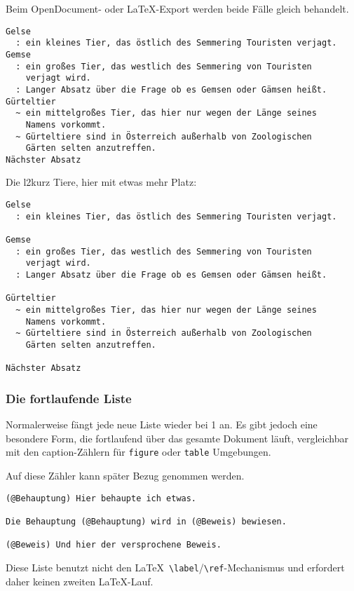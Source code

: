 \documentclass[11pt,ngerman,a4paper]{article}
\begin{document}
Beim OpenDocument- oder LaTeX-Export werden beide Fälle gleich
behandelt.

\begin{verbatim}
Gelse
  : ein kleines Tier, das östlich des Semmering Touristen verjagt.
Gemse
  : ein großes Tier, das westlich des Semmering von Touristen 
    verjagt wird.
  : Langer Absatz über die Frage ob es Gemsen oder Gämsen heißt.
Gürteltier
  ~ ein mittelgroßes Tier, das hier nur wegen der Länge seines 
    Namens vorkommt.
  ~ Gürteltiere sind in Österreich außerhalb von Zoologischen 
    Gärten selten anzutreffen.
Nächster Absatz
\end{verbatim}

Die l2kurz Tiere, hier mit etwas mehr Platz:

\begin{verbatim}
Gelse
  : ein kleines Tier, das östlich des Semmering Touristen verjagt.

Gemse
  : ein großes Tier, das westlich des Semmering von Touristen 
    verjagt wird.
  : Langer Absatz über die Frage ob es Gemsen oder Gämsen heißt.

Gürteltier
  ~ ein mittelgroßes Tier, das hier nur wegen der Länge seines 
    Namens vorkommt.
  ~ Gürteltiere sind in Österreich außerhalb von Zoologischen 
    Gärten selten anzutreffen.

Nächster Absatz
\end{verbatim}

\subsubsection{Die fortlaufende Liste}

Normalerweise fängt jede neue Liste wieder bei 1 an. Es gibt jedoch eine
besondere Form, die fortlaufend über das gesamte Dokument läuft,
vergleichbar mit den caption-Zählern für \texttt{figure} oder
\texttt{table} Umgebungen.

Auf diese Zähler kann später Bezug genommen werden.

\begin{verbatim}
(@Behauptung) Hier behaupte ich etwas.

Die Behauptung (@Behauptung) wird in (@Beweis) bewiesen.

(@Beweis) Und hier der versprochene Beweis. 
\end{verbatim}

Diese Liste benutzt nicht den
LaTeX~\texttt{\textbackslash{}label}/\texttt{\textbackslash{}ref}-Mechanismus
und erfordert daher keinen zweiten LaTeX-Lauf.
\end{document}
